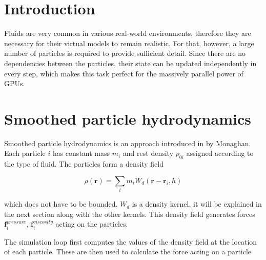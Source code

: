 \documentclass[a4paper,report]{IEEEtran}
\begin{document}


%
\IEEEpeerreviewmaketitle
 
\section{Introduction}
Fluids are very common in various real-world environments, therefore they are necessary for their virtual models to remain realistic. For that, however, a large number of particles is required to provide sufficient detail. Since there are no dependencies between the particles, their state can be updated independently in every step, which makes this task perfect for the massively parallel power of GPUs. 

\section{Smoothed particle hydrodynamics}
Smoothed particle hydrodynamics is an approach introduced in \cite{Articles:Monaghan} by Monaghan.
Each particle $i$ has constant mass $m_{i}$ and rest density $\rho_{0i}$ assigned according to the type of fluid. The particles form a density field

\begin{equation}
	\rho(\mathbf{r}) = \sum_{i} m_{i}W_d(\mathbf{r}-\mathbf{r}_i, h)
\end{equation}

which does not have to be bounded. $W_d$ is a density kernel, it will be explained in the next section along with the other kernels. This density field generates forces $\mathbf{f}_{i}^{pressure}$, $\mathbf{f}_{i}^{viscosity}$ acting on the particles. 

The simulation loop first computes the values of the density field at the location of each particle. These are then used to calculate the force acting on a particle
\end{document}
